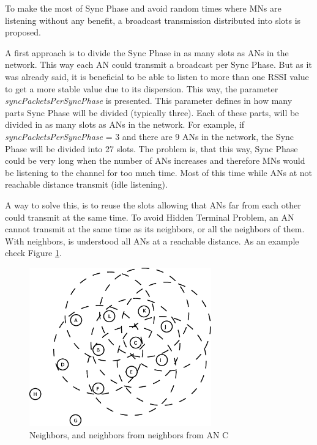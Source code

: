 To make the most of Sync Phase and avoid random times where \acp{MN} are listening without any benefit, a broadcast transmission distributed into slots is proposed.

A first approach is to divide the Sync Phase in as many slots as \acp{AN} in the network. This way each \ac{AN} could transmit a broadcast per Sync Phase.
But as it was already said, it is beneficial to be able to listen to more than one \ac{RSSI} value to get a more stable value due to its dispersion. This
way, the parameter \textit{syncPacketsPerSyncPhase} is presented. This parameter defines in how many parts Sync Phase will be divided (typically three). Each of 
these parts, will be divided in as many slots as \acp{AN} in the network. For example, if \textit{syncPacketsPerSyncPhase} = 3 and there are 9 \acp{AN} in the 
network, the Sync Phase will be divided into 27 slots. The problem is, that this way, Sync Phase could be very long when the number of \acp{AN} increases and therefore
\acp{MN} would be listening to the channel for too much time. Most of this time while \acp{AN} at not reachable distance transmit (idle listening).

A way to solve this, is to reuse the slots allowing that \acp{AN} far from each other could transmit at the same time. To avoid Hidden Terminal 
Problem, an \ac{AN} cannot transmit at the same time as its neighbors, or all the neighbors of them. With neighbors, is understood all \acp{AN} at a 
reachable distance. As an example check Figure \ref{fig:ejemplonetslots}.

\begin{figure}[ht]
 \begin{center}
  \includegraphics[width=0.7\textwidth]{ejemplonetslots.eps}
 \end{center}
 \caption{Neighbors, and neighbors from neighbors from \ac{AN} C}
 \label{fig:ejemplonetslots}
\end{figure}


